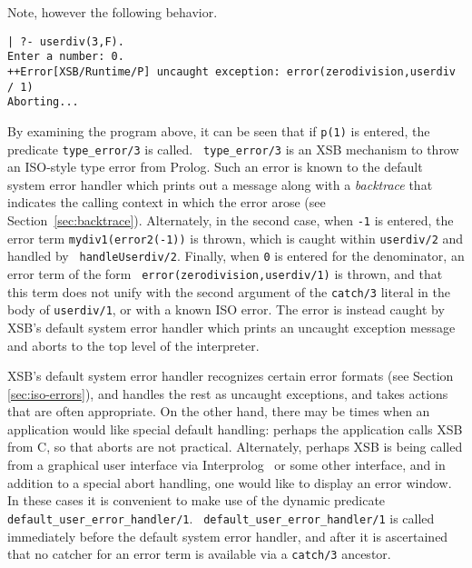 \noindent
Note, however the following behavior.

\begin{small}
\begin{verbatim}
| ?- userdiv(3,F).
Enter a number: 0.
++Error[XSB/Runtime/P] uncaught exception: error(zerodivision,userdiv / 1)
Aborting...
\end{verbatim}
\end{small}

\noindent
By examining the program above, it can be seen that if {\tt p(1)} is
entered, the predicate {\tt type\_error/3} is called.  {\tt
  type\_error/3} is an XSB mechanism to throw an ISO-style type error
from Prolog.  Such an error is known to the default system error
handler which prints out a message along with a {\em backtrace} that
indicates the calling context in which the error arose (see
Section~\ref{sec:backtrace}).  Alternately, in the second case, when
{\tt -1} is entered, the error term {\tt mydiv1(error2(-1))} is thrown,
which is caught within {\tt userdiv/2} and handled by {\tt
  handleUserdiv/2}.  Finally, when {\tt 0} is entered for the
denominator, an error term of the form {\tt
  error(zerodivision,userdiv/1)} is thrown, and that this term does
not unify with the second argument of the {\tt catch/3} literal in the
body of {\tt userdiv/1}, or with a known ISO error.  The error is
instead caught by XSB's default system error handler which prints an
uncaught exception message and aborts to the top level of the
interpreter.  

XSB's default system error handler recognizes certain error formats
(see Section \ref{sec:iso-errors}), and handles the rest as uncaught
exceptions, and takes actions that are often appropriate.  On the
other hand, there may be times when an application would like special
default handling: perhaps the application calls XSB from C, so that
aborts are not practical.  Alternately, perhaps XSB is being called
from a graphical user interface via Interprolog~\cite{Cale01} or some
other interface, and in addition to a special abort handling, one
would like to display an error window.  In these cases it is
convenient to make use of the dynamic predicate {\tt
  default\_user\_error\_handler/1}.  {\tt
  default\_user\_error\_handler/1} is called immediately before the
default system error handler, and after it is ascertained that no
catcher for an error term is available via a {\tt catch/3} ancestor.

